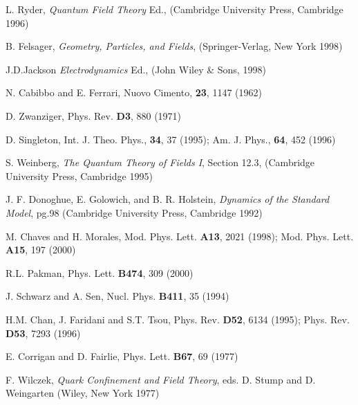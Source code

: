 \documentclass[a4paper,aps]{revtex4}
\begin{document}
\begin{thebibliography}{}

 L. Ryder, {\it Quantum Field Theory} \coordHE{} Ed.,
(Cambridge University Press, Cambridge 1996)

 B. Felsager, {\it Geometry, Particles, and Fields},
(Springer-Verlag, New York 1998)

 J.D.Jackson {\it Electrodynamics} \coordHE{} Ed.,
(John Wiley \& Sons, 1998)

 N. Cabibbo and E. Ferrari, Nuovo Cimento, {\bf 23},
1147 (1962)

 D. Zwanziger, Phys. Rev. {\bf D3}, 880 (1971)

 D. Singleton, Int. J. Theo. Phys., {\bf 34},
37 (1995); Am. J. Phys., {\bf 64}, 452 (1996)

 S. Weinberg, {\it The Quantum Theory of Fields I},
Section 12.3, (Cambridge University Press, Cambridge 1995)

 J. F. Donoghue, E. Golowich, and B. R. Holstein,
{\it Dynamics of the Standard Model}, pg.98 (Cambridge University
Press, Cambridge 1992)

 M. Chaves and H. Morales, Mod. Phys. Lett. {\bf A13},
2021 (1998); Mod. Phys. Lett. {\bf A15}, 197 (2000)

 R.L. Pakman, Phys. Lett.  {\bf B474}, 309 (2000)

 J. Schwarz and A. Sen, Nucl. Phys. {\bf B411}, 35 (1994)

 H.M. Chan, J. Faridani and S.T. Tsou, Phys. Rev. {\bf D52},
6134 (1995); Phys. Rev. {\bf D53}, 7293 (1996)

 E. Corrigan and D. Fairlie, Phys. Lett. {\bf B67}, 69
(1977)

 F. Wilczek, {\it Quark Confinement and Field Theory},
eds. D. Stump and D. Weingarten (Wiley, New York 1977)

\end{thebibliography}
\end{document}
